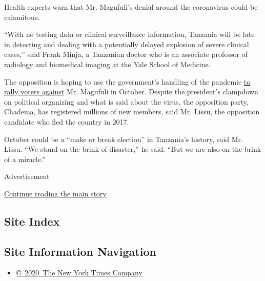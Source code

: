 Health experts warn that Mr. Magufuli's denial around the coronavirus
could be calamitous.

``With no testing data or clinical surveillance information, Tanzania
will be late in detecting and dealing with a potentially delayed
explosion of severe clinical cases,'' said Frank Minja, a Tanzanian
doctor who is an associate professor of radiology and biomedical imaging
at the Yale School of Medicine.

The opposition is hoping to use the government's handling of the
pandemic
\href{https://twitter.com/zittokabwe/status/1259467054014500864}{to
rally voters against} Mr. Magufuli in October. Despite the president's
clampdown on political organizing and what is said about the virus, the
opposition party, Chadema, has registered millions of new members, said
Mr. Lissu, the opposition candidate who fled the country in 2017.

October could be a ``make or break election'' in Tanzania's history,
said Mr. Lissu. ``We stand on the brink of disaster,'' he said. ``But we
are also on the brink of a miracle.''

Advertisement

\protect\hyperlink{after-bottom}{Continue reading the main story}

\hypertarget{site-index}{%
\subsection{Site Index}\label{site-index}}

\hypertarget{site-information-navigation}{%
\subsection{Site Information
Navigation}\label{site-information-navigation}}

\begin{itemize}
\tightlist
\item
  \href{https://help.nytimes.com/hc/en-us/articles/115014792127-Copyright-notice}{©~2020~The
  New York Times Company}
\end{itemize}

